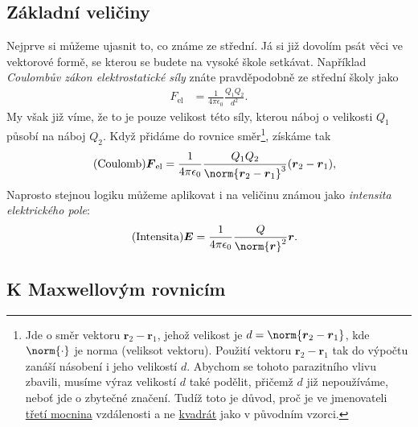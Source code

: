 \documentclass[11pt,a4paper]{report}
\renewcommand{\vec}{\boldsymbol}
\begin{document}
	\subsection*{Základní veličiny}
		Nejprve si můžeme ujasnit to, co známe ze střední. Já si již dovolím psát věci ve vektorové formě, se kterou se budete na vysoké škole setkávat. Například \textit{Coulombův zákon elektrostatické síly} znáte pravděpodobně ze střední školy jako
	\begin{align*}
		F_{\mathrm{el}} &= \frac{1}{4 \pi \epsilon_0} \frac{Q_1 Q_2}{d^2}.
	\end{align*}
	My však již víme, že to je pouze velikost této síly, kterou náboj o velikosti $Q_1$ působí na náboj $Q_2$. Když přidáme do rovnice směr\footnote{Jde o směr vektoru $\vec r_2 - \vec r_1$, jehož velikost je $d = \norm{\vec r_2 - \vec r_1}$, kde $\norm{\cdot}$ je norma (veliksot vektoru). Použití vektoru $\vec r_2 - \vec r_1$ tak do výpočtu zanáší násobení i jeho velikostí $d$. Abychom se tohoto parazitního vlivu zbavili, musíme výraz velikostí $d$ také podělit, přičemž $d$ již nepoužíváme, neboť jde o zbytečné značení. Tudíž toto je důvod, proč je ve jmenovateli \underline{třetí mocnina} vzdálenosti a ne \underline{kvadrát} jako v původním vzorci.}, získáme tak
	\begin{align}
		\tag{Coulomb}
		\vec F_{\mathrm{el}} &= \frac{1}{4 \pi \epsilon_0} \frac{Q_1 Q_2}{\norm{\vec r_2 - \vec r_1}^3} (\vec r_2 - \vec r_1),
	\end{align}
	Naprosto stejnou logiku můžeme aplikovat i na veličinu známou jako \textit{intensita elektrického pole}:
	\begin{align}
		\tag{Intensita}
		\vec E &= \frac{1}{4 \pi \epsilon_0} \frac{Q}{\norm{\vec r}^2} \vec r.
	\end{align}
\newpage
	
	\subsection*{K Maxwellovým rovnicím}
		
\end{document}
